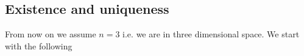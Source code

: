 \documentclass[12pt,a4paper]{article}
\newtheorem{proposition}{Proposition}
\theoremstyle{definition}
\newcommand{\real}{\mathbb{R}}
\begin{document}
\subsection{Existence and uniqueness}


From now on we assume $n=3$ i.e. we are in three dimensional space.
We start with the following
\end{document}
